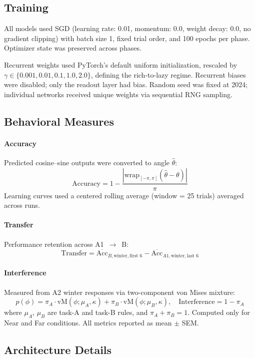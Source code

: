 \documentclass{article}
\theoremstyle{plain}
\theoremstyle{definition}
\theoremstyle{remark}
\begin{document}
\subsection{Training}

All models used SGD (learning rate: 0.01, momentum: 0.0, weight decay: 0.0, no gradient clipping) with batch size 1, fixed trial order, and 100 epochs per phase. Optimizer state was preserved across phases.

Recurrent weights used PyTorch's default uniform initialization, rescaled by $\gamma \in \{0.001, 0.01, 0.1, 1.0, 2.0\}$, defining the rich-to-lazy regime. Recurrent biases were disabled; only the readout layer had bias. Random seed was fixed at 2024; individual networks received unique weights via sequential RNG sampling.

\subsection{Behavioral Measures}

\paragraph{Accuracy} Predicted cosine--sine outputs were converted to angle $\hat{\theta}$:
\[
\text{Accuracy} = 1 - \frac{\left|\mathrm{wrap}_{[-\pi,\pi]}(\hat{\theta}-\theta)\right|}{\pi}
\]
Learning curves used a centered rolling average (window = 25 trials) averaged across runs.

\paragraph{Transfer} Performance retention across A1~$\rightarrow$~B:
\[
\text{Transfer} = \overline{\text{Acc}}_{B,\text{winter},\text{first 6}} - \overline{\text{Acc}}_{A1,\text{winter},\text{last 6}}
\]

\paragraph{Interference} Measured from A2 winter responses via two-component von Mises mixture:
\[
p(\phi) = \pi_A \cdot \mathrm{vM}(\phi;\mu_A,\kappa) + \pi_B \cdot \mathrm{vM}(\phi;\mu_B,\kappa), \quad \text{Interference} = 1 - \pi_A
\]
where $\mu_A$, $\mu_B$ are task-A and task-B rules, and $\pi_A + \pi_B = 1$. Computed only for Near and Far conditions. All metrics reported as mean $\pm$ SEM.

\subsection{Architecture Details}
\end{document}
